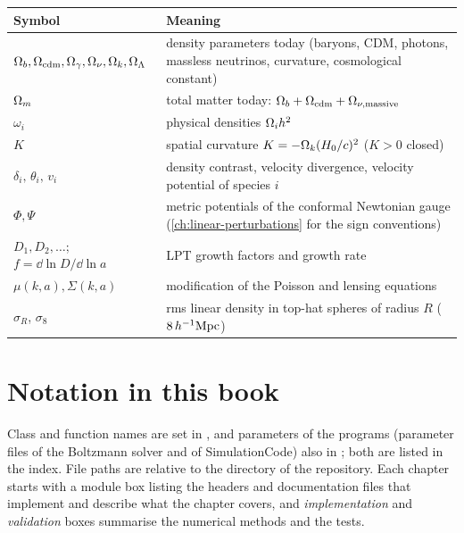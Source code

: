 \begin{center}\small
\begin{tabularx}{\textwidth}{@{}lX@{}}
\toprule
Symbol & Meaning \\
\midrule
$\Omega_b,\Omega_{\rm cdm},\Omega_\gamma,\Omega_\nu,\Omega_k,\Omega_\Lambda$ & density parameters today (baryons, CDM, photons,
  massless neutrinos, curvature, cosmological constant) \\
$\Omega_m$ & total matter today: $\Omega_b+\Omega_{\rm cdm}+\Omega_{\nu,\rm massive}$ \\
$\omega_i$ & physical densities $\Omega_ih^2$ \\
$K$ & spatial curvature $K=-\Omega_k(H_0/c)^2$ ($K>0$ closed) \\
$\delta_i,\,\theta_i,\,v_i$ & density contrast, velocity divergence, velocity potential of species $i$ \\
$\Phi,\Psi$ & metric potentials of the conformal Newtonian gauge (\cref{ch:linear-perturbations} for the sign
  conventions) \\
$D_1,D_2,\dots$; $f=\dd\ln D/\dd\ln a$ & LPT growth factors and growth rate \\
$\mu(k,a),\Sigma(k,a)$ & modification of the Poisson and lensing equations \\
$\sigma_R$, $\sigma_8$ & rms linear density in top-hat spheres of radius $R$ ($8\,h^{-1}\mathrm{Mpc}$) \\
\bottomrule
\end{tabularx}
\end{center}

\section{Notation in this book}

Class and function names are set in , and parameters of the programs (parameter files of the
Boltzmann solver and of SimulationCode) also in ; both are listed in the index. File paths are
relative to the  directory of the repository. Each chapter starts with a module box listing the headers and
documentation files that implement and describe what the chapter covers, and \emph{implementation} and
\emph{validation} boxes summarise the numerical methods and the tests.
